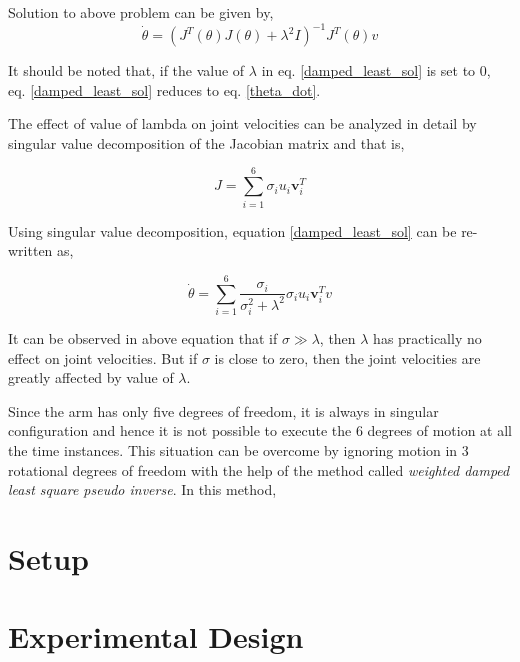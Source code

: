 Solution to above problem can be given by, 
\begin{equation}\label{damped_least_sol}
	\dot{\theta} = (J^{T}(\theta)J(\theta) + \lambda^{2}I)^{-1}J^{T}(\theta)v
\end{equation} 

It should be noted that, if the value of $\lambda$ in eq. \ref{damped_least_sol} is set to 0, eq. \ref{damped_least_sol} reduces to eq. \ref{theta_dot}.

The effect of value of lambda on joint velocities can be analyzed in detail by singular value decomposition of the Jacobian matrix and that is, 

\begin{equation}
	J = \sum_{i=1}^{6}\sigma_{i}u_{i}\textbf{v}_{i}^{T}
\end{equation} 

Using singular value decomposition, equation \ref{damped_least_sol} can be re-written as,

\begin{equation}
\dot{\theta} = \sum_{i=1}^{6}\frac{\sigma_{i}}{\sigma_{i}^{2} + \lambda^{2} }\sigma_{i}u_{i}\textbf{v}_{i}^{T}v
\end{equation} 

It can be observed in above equation that if $\sigma \gg \lambda$, then $\lambda$ has practically no effect on joint velocities. But if $\sigma$ is close to zero, then the joint velocities are greatly affected by value of $\lambda$.  

Since the arm has only five degrees of freedom, it is always in singular configuration and hence it is not possible to execute the 6 degrees of motion at all the time instances. This situation can be overcome by ignoring motion in 3 rotational degrees of freedom with the help of the method called \textit{weighted damped least square pseudo inverse}. In this method, 	
\section{Setup}


\section{Experimental Design}
